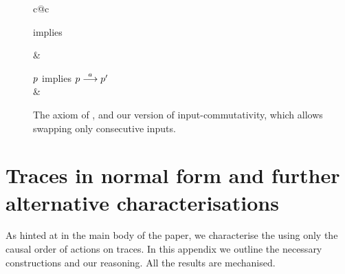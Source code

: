 \begin{figure}[t]
\hrulefill
\begin{center}
  \begin{tabular}{c@{\hskip 20pt}c}
implies

& %

$ p $ implies  $p \mathrel{\overset{ a }\longrightarrow} p'$
\\[5pt]
\restrictedinputcommutativity  &  
  \end{tabular}
\end{center}
\caption{The  axiom of \cite{DBLP:conf/concur/Selinger97},
  and our version of input-commutativity, which allows swapping only
  consecutive inputs.}
\label{fig:restricted-input-commutativity}
\hrulefill
\end{figure}


\section{Traces in normal form and further alternative characterisations}
\label{sec:normal-form}

As hinted at in the main body of the paper, we characterise the \mustpreorder
using only the causal order of actions on traces. In this appendix we outline
the necessary constructions and our reasoning. All the results are mechanised.


